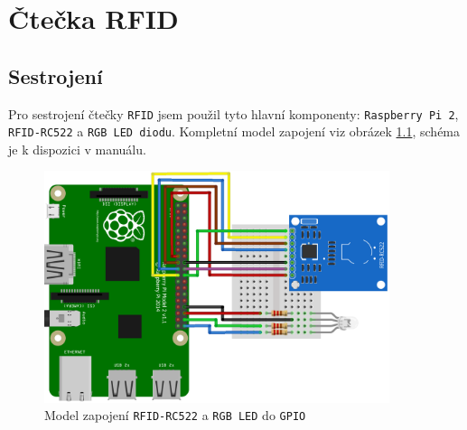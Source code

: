 \documentclass[czech,BP]{thesiskiv}
\begin{document}
	
	
	
	
	
	
	
	
	
	
	
	
	

	
	
\chapter{Čtečka RFID}
	\section{Sestrojení}
	
		Pro sestrojení čtečky \texttt{RFID} jsem použil tyto hlavní komponenty: \texttt{Raspberry Pi 2}, \texttt{RFID-RC522} a \texttt{RGB LED diodu}. 
		Kompletní model zapojení viz obrázek \ref{fig:reader_rfid_diagram}, schéma je k dispozici v manuálu.
		
\begin{figure}[H]
		\centering
		\includegraphics[width=0.9\textwidth]{../diagrams/reader_rfid_diagram_bb.png}	
		\caption{Model zapojení \texttt{RFID-RC522} a \texttt{RGB LED} do \texttt{GPIO}}
		\label{fig:reader_rfid_diagram}
	\end{figure}		
		
				
\end{document}
